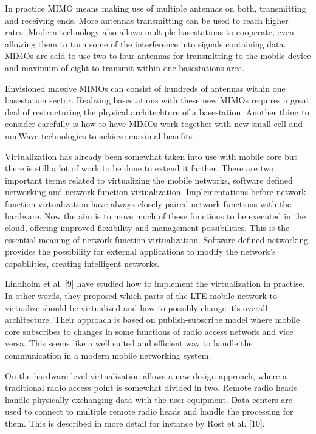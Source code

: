 \documentclass[conference]{IEEEtran}
\begin{document}
\par
In practice MIMO means making use of multiple antennas on both, transmitting and receiving ends. More antennas transmitting can be used to reach higher rates. Modern technology also allows multiple basestations to cooperate, even allowing them to turn some of the interference into signals containing data. MIMOs are said to use two to four antennas for transmitting to the mobile device and maximum of eight to transmit within one basestations area.
\par
Envisioned massive MIMOs can consist of hundreds of antennas within one basestation sector. Realizing basestations with these new MIMOs requires a great deal of restructuring the physical architechture of a basestation. Another thing to consider carefully is how to have MIMOs work together with new small cell and mmWave technologies to achieve maximal benefits.
\par
Virtualization has already been somewhat taken into use with mobile core but there is still a lot of work to be done to extend it farther. There are two important terms related to virtualizing the mobile networks, software defined networking and network function virtualization. Implementations before network function virtualization have always closely paired network functions with the hardware. Now the aim is to move much of these functions to be executed in the cloud, offering improved flexibility and management possibilities. This is the essential meaning of network function virtualization. Software defined networking provides the possibility for external applications to modify the network's capabilities, creating intelligent networks.
\par
Lindholm et al. [9] have studied how to implement the virtualization in practise. In other words, they proposed which parts of the LTE mobile network to virtualize should be virtualized and how to possibly change it's overall architecture. Their approach is based on publish-subscribe model where mobile core subscribes to changes in some functions of radio access network and vice versa. This seems like a well suited and efficient way to handle the communication in a modern mobile networking system.
\par
On the hardware level virtualization allows a new design approach, where a traditional radio access point is somewhat divided in two. Remote radio heads handle physically exchanging data with the user equipment. Data centers are used to connect to multiple remote radio heads and handle the processing for them. This is described in more detail for instance by Rost et al. [10].
\end{document}
